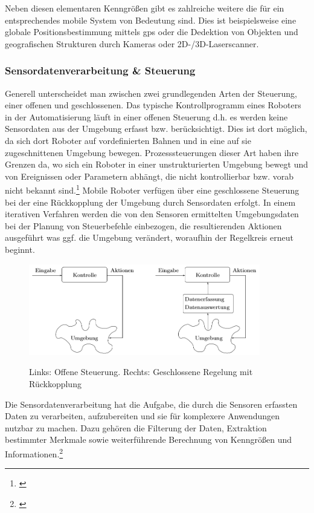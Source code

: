 Neben diesen elementaren Kenngrößen gibt es zahlreiche weitere die für ein entsprechendes mobile System von Bedeutung sind. Dies ist beispielsweise eine globale Positionsbestimmung mittels \gls{gps} oder die Dedektion von Objekten und geografischen Strukturen durch Kameras oder 2D-/3D-Laserscanner.
\subsubsection{Sensordatenverarbeitung \& Steuerung}
\color{process}
Generell unterscheidet man zwischen zwei grundlegenden Arten der Steuerung, einer offenen und geschlossenen. Das typische Kontrollprogramm eines Roboters in der Automatisierung läuft in einer offenen Steuerung d.h. es werden keine Sensordaten aus der Umgebung erfasst bzw. berücksichtigt. Dies ist dort möglich, da sich dort Roboter auf vordefinierten Bahnen und in eine auf sie zugeschnittenen Umgebung bewegen.
\newline
Prozesssteuerungen dieser Art haben ihre Grenzen da, wo sich ein Roboter in einer unstrukturierten Umgebung bewegt und von Ereignissen oder Parametern abhängt, die nicht kontrollierbar bzw. vorab nicht bekannt sind.\footnote{\citep[vgl.][Mobile Roboter, Seite 3 f.]{Hertzberg.MobileRoboter}\label{note14}}
Mobile Roboter verfügen über eine geschlossene Steuerung bei der eine Rückkopplung der Umgebung durch Sensordaten erfolgt. In einem iterativen Verfahren werden die von den Sensoren ermittelten Umgebungsdaten bei der Planung von Steuerbefehle einbezogen, die resultierenden Aktionen ausgeführt was ggf. die Umgebung verändert, woraufhin der Regelkreis erneut beginnt.
\begin{figure}[ht]
	\centering
		\includegraphics[width=0.90\textwidth]{images/technische_grundlagen/Steuerungsarten.png}
		\caption[Vergleich Offene und Geschlossene Steuerung]{Links: Offene Steuerung. Rechts: Geschlossene Regelung mit Rückkopplung}
		\cite{Hertzberg.MobileRoboter}
\end{figure}
\newline
Die Sensordatenverarbeitung hat die Aufgabe, die durch die Sensoren erfassten Daten zu verarbeiten, aufzubereiten und sie für komplexere Anwendungen nutzbar zu machen. Dazu gehören die Filterung der Daten, Extraktion bestimmter Merkmale sowie weiterführende Berechnung von Kenngrößen und Informationen.\footnote{\citep[vgl.][Mobile Roboter, Seite 67]{Hertzberg.MobileRoboter}\label{note15}}
